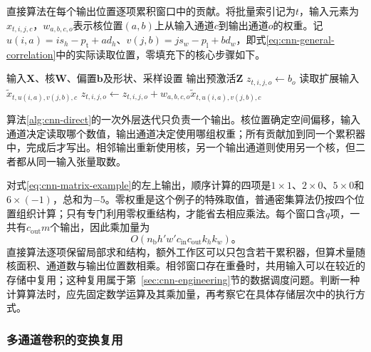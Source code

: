 直接算法在每个输出位置逐项累积窗口中的贡献。将批量索引记为$t$，输入元素为$x_{t,i,j,c}$，$w_{a,b,c,o}$表示核位置$(a,b)$上从输入通道$c$到输出通道$o$的权重。记$u(i,a)=is_h-p_{\mathrm t}+ad_h$、$v(j,b)=js_w-p_{\mathrm l}+bd_w$，即式\eqref{eq:cnn-general-correlation}中的实际读取位置，零填充下的核心步骤如下。
\begin{algorithm}[直接多通道互相关]
  \label{alg:cnn-direct}
  \begin{algorithmic}[1]
    \Require 输入$\bm X$、核$\bm W$、偏置$\bm b$及形状、采样设置
    \Ensure 输出预激活$\bm Z$
      \State $z_{t,i,j,o}\gets b_o$
        \State 读取扩展输入$\widetilde x_{t,u(i,a),v(j,b),c}$
        \State $z_{t,i,j,o}\gets z_{t,i,j,o}+w_{a,b,c,o}\widetilde x_{t,u(i,a),v(j,b),c}$
      \EndFor
    \EndFor
  \end{algorithmic}
\end{algorithm}

算法\ref{alg:cnn-direct}的一次外层迭代只负责一个输出。核位置确定空间偏移，输入通道决定读取哪个数值，输出通道决定使用哪组权重；所有贡献加到同一个累积器中，完成后才写出。相邻输出重新使用核，另一个输出通道则使用另一个核，但二者都从同一输入张量取数。

对式\eqref{eq:cnn-matrix-example}的左上输出，顺序计算的四项是$1\times1$、$2\times0$、$5\times0$和$6\times(-1)$，总和为$-5$。零权重是这个例子的特殊取值，普通密集算法仍按四个位置组织计算；只有专门利用零权重结构，才能省去相应乘法。每个窗口含$q$项，一共有$c_{\mathrm{out}}m$个输出，因此乘加量为
\begin{equation}
  O\!\left(n_{\mathrm b}h'w'c_{\mathrm{in}}c_{\mathrm{out}}k_hk_w\right)\text{。}
  \label{eq:cnn-direct-cost}
\end{equation}
直接算法逐项保留局部求和结构，额外工作区可以只包含若干累积器，但算术量随核面积、通道数与输出位置数相乘。相邻窗口存在重叠时，共用输入可以在较近的存储中复用；这种复用属于第~\ref{sec:cnn-engineering}节的数据调度问题。判断一种计算算法时，应先固定数学运算及其乘加量，再考察它在具体存储层次中的执行方式。

\subsubsection{多通道卷积的变换复用}
\label{sec:cnn-transform-reuse}

